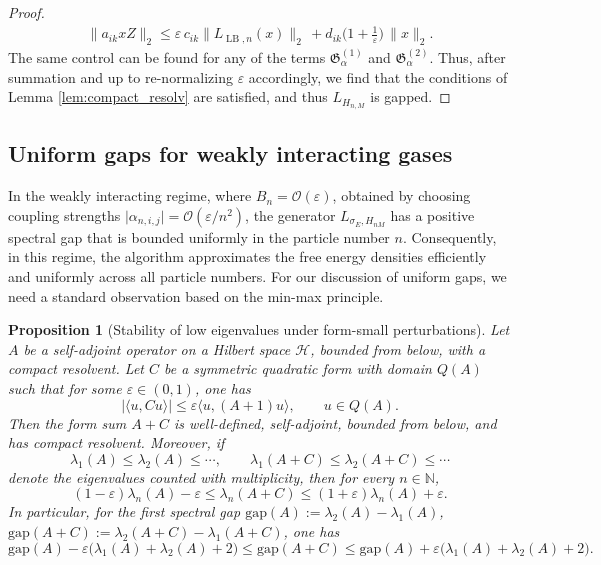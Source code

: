 \documentclass[11pt]{amsart}
\let\epsilon=\varepsilon %
\newcommand{\1}{\mathbbm{1}}
\renewcommand{\epsilon}{\varepsilon}
\theoremstyle{plain}
\newtheorem{proposition}[theorem]{Proposition}
\newcommand{\gap}{\mathrm{gap}}
\theoremstyle{definition}
\theoremstyle{remark}
\numberwithin{equation}{section}
\begin{document}
\begin{proof}
\begin{align*}
\|a_{ik}xZ\|_2\le \varepsilon \,c_{ik}\|L_{\operatorname{LB},n}(x)\|_2\,+d_{ik}\Big(1+\frac{1}{\epsilon}\Big)\,\|x\|_2.
\end{align*}
The same control can be found for any of the terms $\mathfrak{G}_\alpha^{(1)}$ and $\mathfrak{G}_\alpha^{(2)}$. Thus, after summation and up to re-normalizing $\varepsilon$ accordingly, we find that the conditions of Lemma  \ref{lem:compact_resolv} are satisfied, and thus $L_{H_{n,M}}$ is gapped. 
 
\end{proof}


\subsection{Uniform gaps for weakly interacting gases}

In the weakly interacting regime, where \(B_n=\mathcal O(\varepsilon)\), obtained by choosing coupling strengths \(\lvert \alpha_{n,i,j}\rvert=\mathcal O(\varepsilon/n^2)\), the generator \(L_{\sigma_E,H_{nM}}\) has a positive spectral gap that is bounded uniformly in the particle number \(n\). Consequently, in this regime, the algorithm approximates the free energy densities efficiently and uniformly across all particle numbers. For our discussion of uniform gaps, we need a standard observation based on the min-max principle.
\begin{proposition}[Stability of low eigenvalues under form-small perturbations]
\label{prop:gap-form-small}
Let $A$ be a self-adjoint operator on a Hilbert space $\mathcal H$, bounded from below, with a compact resolvent. Let $C$ be a symmetric quadratic form with domain $Q(A)$ such that for some $\varepsilon\in(0,1)$, one has
\begin{equation}
\label{eq:form-small-eps}
|\langle u,Cu\rangle|
\le \varepsilon \langle u,(A+1)u\rangle ,
\qquad u\in Q(A).
\end{equation}
Then the form sum $A+C$ is well-defined, self-adjoint, bounded from below, and has compact resolvent. Moreover, if
\[
\lambda_1(A)\le \lambda_2(A)\le \cdots,\qquad
\lambda_1(A+C)\le \lambda_2(A+C)\le \cdots
\]
denote the eigenvalues counted with multiplicity, then for every $n\in \mathbb N$,
\begin{equation}
\label{eq:eigenvalue-comparison}
(1-\varepsilon)\lambda_n(A)-\varepsilon
\le \lambda_n(A+C)
\le (1+\varepsilon)\lambda_n(A)+\varepsilon.
\end{equation}
In particular, for the first spectral gap $\gap(A):=\lambda_2(A)-\lambda_1(A)$, $\gap(A+C):=\lambda_2(A+C)-\lambda_1(A+C)$, one has
\begin{equation}
\label{eq:gap-lower}
\gap(A)-\varepsilon\bigl(\lambda_1(A)+\lambda_2(A)+2\bigr)\le  \gap(A+C)\le \gap(A)+\varepsilon\bigl(\lambda_1(A)+\lambda_2(A)+2\bigr).
\end{equation}
\end{proposition}
\end{document}
